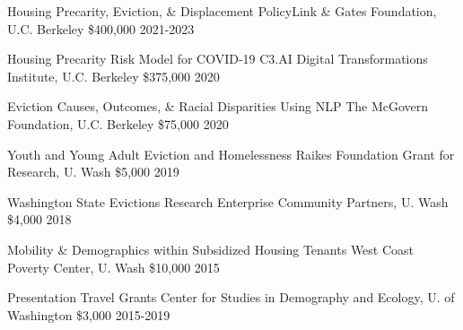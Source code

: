 



\begin{cvhonors}

  \cvhonor
    {Housing Precarity, Eviction, \& Displacement} %
    {PolicyLink \& Gates Foundation, U.C. Berkeley} %
    {\$400,000} %
    {2021-2023} %

  \cvhonor
    {Housing Precarity Risk Model for COVID-19} %
    {C3.AI Digital Transformations Institute, U.C. Berkeley} %
    {\$375,000} %
    {2020} %

  \cvhonor
    {Eviction Causes, Outcomes, \& Racial Disparities Using NLP} %
    {The McGovern Foundation, U.C. Berkeley} %
    {\$75,000} %
    {2020} %

  \cvhonor
    {Youth and Young Adult Eviction and Homelessness} %
    {Raikes Foundation Grant for Research, U. Wash} %
    {\$5,000} %
    {2019} %

  \cvhonor
    {Washington State Evictions Research} %
    {Enterprise Community Partners, U. Wash} %
    {\$4,000} %
    {2018} %

   \cvhonor
    {Mobility \& Demographics within Subsidized Housing Tenants} %
    {West Coast Poverty Center, U. Wash} %
    {\$10,000} %
    {2015} %
    
  \cvhonor
    {Presentation Travel Grants} %
    {Center for Studies in Demography and Ecology, U. of Washington} %
    {\$3,000} %
    {2015-2019} %


\end{cvhonors}


